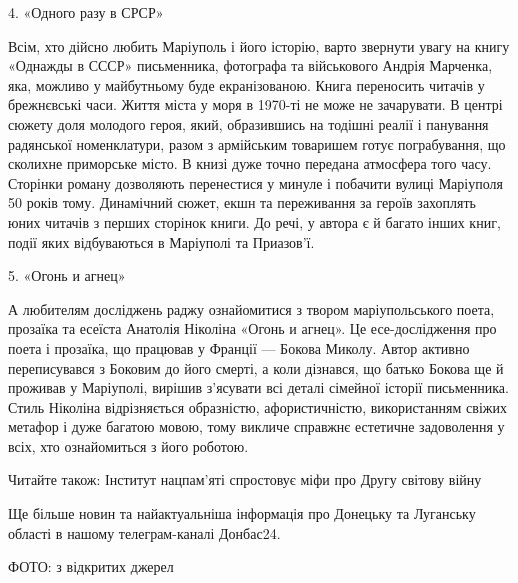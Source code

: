 4. «Одного разу в СРСР»

Всім, хто дійсно любить Маріуполь і його історію, варто звернути увагу на книгу
«Однажды в СССР» письменника, фотографа та військового Андрія Марченка, яка,
можливо у майбутньому буде екранізованою. Книга переносить читачів у
брежнєвські часи. Життя міста у моря в 1970-ті не може не зачарувати. В центрі
сюжету доля молодого героя, який, образившись на тодішні реалії і панування
радянської номенклатури, разом з армійським товаришем готує пограбування, що
сколихне приморське місто. В книзі дуже точно передана атмосфера того часу.
Сторінки роману дозволяють перенестися у минуле і побачити вулиці Маріуполя 50
років тому. Динамічний сюжет, екшн та переживання за героїв захоплять юних
читачів з перших сторінок книги. До речі, у автора є й багато інших книг, події
яких відбуваються в Маріуполі та Приазов'ї.

5. «Огонь и агнец»

А любителям досліджень раджу ознайомитися з твором маріупольського поета,
прозаїка та есеїста Анатолія Ніколіна «Огонь и агнец». Це есе-дослідження про
поета і прозаїка, що працював у Франції — Бокова Миколу. Автор активно
переписувався з Боковим до його смерті, а коли дізнався, що батько Бокова ще й
проживав у Маріуполі, вирішив з’ясувати всі деталі сімейної історії
письменника. Стиль Ніколіна відрізняється образністю, афористичністю,
використанням свіжих метафор і дуже багатою мовою, тому викличе справжнє
естетичне задоволення у всіх, хто ознайомиться з його роботою.

Читайте також: Інститут нацпам’яті спростовує міфи про Другу світову війну

Ще більше новин та найактуальніша інформація про Донецьку та Луганську області
в нашому телеграм-каналі Донбас24.

ФОТО: з відкритих джерел
